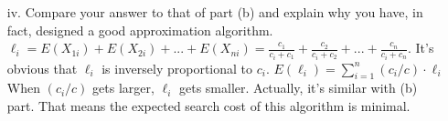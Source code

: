 \documentclass{article}       %
\begin{document}
\begin{enumerate}
\begin{enumerate}
\begin{enumerate}
			\item[iv.] Compare your answer to that of part (b) and explain why you have, in fact, designed a good approximation algorithm.\newline\newline
			${\ell}_i = E(X_{1i}) + E(X_{2i}) + ... + E(X_{ni}) = \frac{c_1}{c_i+c_1} + \frac{c_2}{c_i+c_2} + ... + \frac{c_n}{c_i+c_n}$.\newline
			It's obvious that ${\ell}_i$ is inversely proportional to $c_i$.\newline
			$E({\ell}_i) = \sum_{i=1}^{n} (c_i/c)\cdot {\ell}_i$\newline
			When $(c_i/c)$ gets larger, ${\ell}_i$ gets smaller. Actually, it's similar with (b) part. That means the expected search cost of this algorithm is minimal.
		\end{enumerate}	
	\end{enumerate}
                
\end{enumerate}
\end{document}
